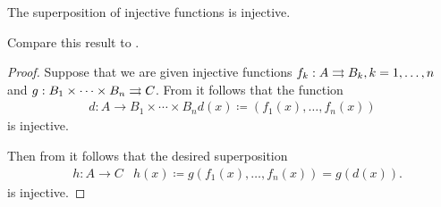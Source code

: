 \begin{proposition}\label{thm:function_superposition_invertibility}
  The superposition of injective functions is injective.

  Compare this result to .
\end{proposition}
\begin{proof}
  Suppose that we are given injective functions \( f_k: A \rightrightarrows B_k, k = 1, \ldots, n \) and \( g: B_1 \times \cdots \times B_n \rightrightarrows C \). From  it follows that the function
  \begin{equation*}
    \begin{aligned}
      d: A \to B_1 \times \cdots \times B_n
      d(x) \coloneqq (f_1(x), \ldots, f_n(x))
    \end{aligned}
  \end{equation*}
  is injective.

  Then from  it follows that the desired superposition
  \begin{equation*}
    \begin{aligned}
      &h: A \to C
      &h(x) \coloneqq g(f_1(x), \ldots, f_n(x)) = g(d(x)).
    \end{aligned}
  \end{equation*}
  is injective.
\end{proof}
